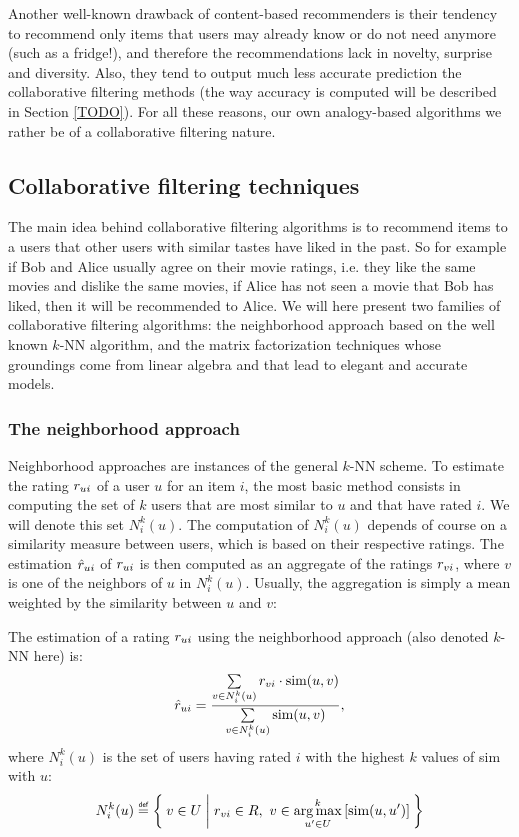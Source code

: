 Another well-known drawback of content-based recommenders is their tendency to
recommend only items that users may already know or do not need anymore (such
as a fridge!), and therefore the recommendations lack in novelty, surprise and
diversity. Also, they tend to output much less accurate prediction the
collaborative filtering methods (the way accuracy is computed will be described
in Section \ref{TODO}). For all these reasons, our own analogy-based algorithms
we rather be of a collaborative filtering nature.

\subsection{Collaborative filtering techniques}
\label{SEC:collaborative_filtering}

The main idea behind collaborative filtering algorithms is to recommend items
to a users that other users with similar tastes have liked in the past. So for
example if Bob and Alice usually agree on their movie ratings, i.e. they like
the same movies and dislike the same movies, if Alice has not seen a movie that
Bob has liked, then it will be recommended to Alice. We will here present two
families of collaborative filtering algorithms: the neighborhood approach based
on the well known $k$-NN algorithm, and the matrix factorization techniques
whose groundings come from linear algebra and that lead to elegant and accurate
models.

\subsubsection{The neighborhood approach}

Neighborhood approaches are instances of the general $k$-NN scheme. To estimate
the rating $r_{ui}$ of a user $u$ for an item $i$, the most basic method consists
in computing  the set of $k$ users that are most similar to $u$ and
that have rated $i$. We will denote this set $N_i^k(u)$. The computation of
$N_i^k(u)$ depends of course on a similarity measure between users, which is
based on their respective ratings. The estimation $\hat{r}_{ui}$ of $r_{ui}$ is then
computed as an aggregate of the ratings $r_{vi}$, where $v$ is one of the
neighbors of $u$ in $N_i^k(u)$. Usually, the aggregation is simply a mean
weighted by the similarity between $u$ and $v$:

\begin{definition}
  The estimation of a rating $r_{ui}$ using the neighborhood approach (also
  denoted $k$-NN here) is:
  $$\hat{r}_{ui} = \frac{\sum\limits_{v \in N_i^k(u)} r_{vi} \cdot \text{sim}(u, v)}
  {\sum\limits_{v \in N_i^k(u)}\text{sim}(u, v)},$$
  where $N_i^k(u)$ is the set of users having rated $i$ with the highest $k$
  values of sim with $u$:
  $$N_i^k(u) \eqdef \Set{v \in U | \rvi \in R,~v\in \argmax_{u' \in
  U}^k\left[\ssim(u, u')\right]}$$
\end{definition}

